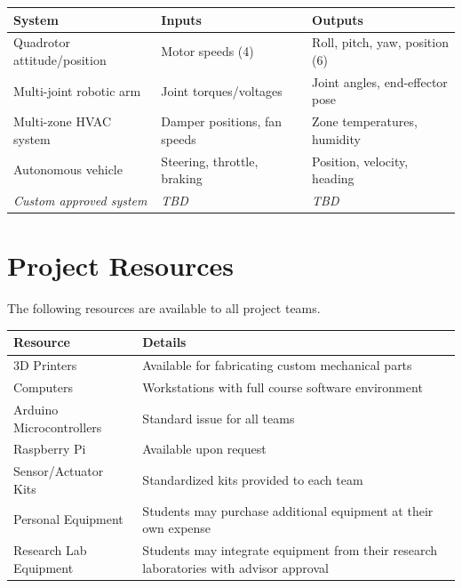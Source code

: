 \documentclass[11pt,letterpaper]{article}
\begin{document}
\begin{table}[htbp]
\begin{tabularx}{\linewidth}{lXX}
\toprule
\textbf{System} & \textbf{Inputs} & \textbf{Outputs} \\
\midrule
Quadrotor attitude/position & Motor speeds (4) & Roll, pitch, yaw, position (6) \\
Multi-joint robotic arm & Joint torques/voltages & Joint angles, end-effector pose \\
Multi-zone HVAC system & Damper positions, fan speeds & Zone temperatures, humidity \\
Autonomous vehicle & Steering, throttle, braking & Position, velocity, heading \\
\textit{Custom approved system} & \textit{TBD} & \textit{TBD} \\
\bottomrule
\end{tabularx}
\end{table}


\section*{Project Resources}
\label{sec:resources}

The following resources are available to all project teams.

\begin{table}[htbp]
\begin{tabularx}{\linewidth}{lX}
\toprule
\textbf{Resource} & \textbf{Details} \\
\midrule
3D Printers & Available for fabricating custom mechanical parts \\
Computers & Workstations with full course software environment \\
Arduino Microcontrollers & Standard issue for all teams \\
Raspberry Pi & Available upon request \\
Sensor/Actuator Kits & Standardized kits provided to each team \\
Personal Equipment & Students may purchase additional equipment at their own expense \\
Research Lab Equipment & Students may integrate equipment from their research laboratories with advisor approval \\
\bottomrule
\end{tabularx}
\end{table}
\end{document}
